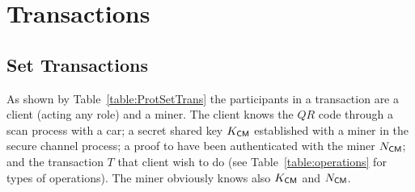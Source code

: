 \section{Transactions}
\label{sec:transactions}



\subsection{Set Transactions} 
\label{ssec:setTrans}

As shown by Table~\ref{table:ProtSetTrans} the participants in a transaction 
are a client (acting any role) and a miner.
The client knows the $QR$ code through a scan process with
a car; a secret shared key $K_{\textsf{C}\textsf{M}}$ established with
a miner in the secure channel process; a proof to have been authenticated
with the miner $N_{\textsf{C}\textsf{M}}$; and the transaction $T$ that client wish 
to do  (see Table~\ref{table:operations} for types of operations). 
The miner obviously knows also $K_{\textsf{C}\textsf{M}}$ and $N_{\textsf{C}\textsf{M}}$. 
